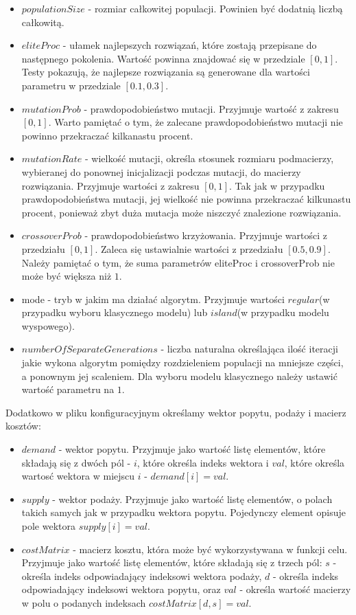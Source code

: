 \begin{itemize}
    \item $populationSize$ - rozmiar całkowitej populacji. Powinien być dodatnią liczbą całkowitą.
    \item $eliteProc$ - ułamek najlepszych rozwiązań, które zostają przepisane do następnego pokolenia. 
    Wartość powinna znajdować się w przedziale $[0, 1]$. Testy pokazują, że najlepsze rozwiązania są generowane dla wartości parametru w przedziale
    $[0.1, 0.3]$.
    \item $mutationProb$ - prawdopodobieństwo mutacji. Przyjmuje wartość z zakresu $[0, 1]$. Warto pamiętać o tym, że zalecane prawdopodobieństwo 
    mutacji nie powinno przekraczać kilkanastu procent.
    \item $mutationRate$ - wielkość mutacji, określa stosunek rozmiaru podmacierzy, wybieranej do ponownej inicjalizacji podczas mutacji, 
    do macierzy rozwiązania. Przyjmuje wartości z zakresu $[0, 1]$. Tak jak w przypadku prawdopodobieństwa mutacji, jej wielkość nie powinna 
    przekraczać kilkunastu procent, ponieważ zbyt duża mutacja może niszczyć znalezione rozwiązania.
    \item $crossoverProb$ - prawdopodobieństwo krzyżowania. Przyjmuje wartości z przedziału $[0, 1]$. Zaleca się ustawialnie wartości z przedziału 
    $[0.5, 0.9]$. Należy pamiętać o tym, że suma parametrów eliteProc i crossoverProb nie może być większa niż $1$.
    \item mode - tryb w jakim ma działać algorytm. Przyjmuje wartości $regular$(w przypadku wyboru klasycznego modelu) lub $island$(w przypadku 
    modelu wyspowego).
    \item $numberOfSeparateGenerations$ - liczba naturalna określająca ilość iteracji jakie wykona algorytm pomiędzy rozdzieleniem populacji na 
    mniejsze części, a ponownym jej scaleniem. Dla wyboru modelu klasycznego należy ustawić wartość parametru na $1$.
\end{itemize}

Dodatkowo w pliku konfiguracyjnym określamy wektor popytu, podaży i macierz kosztów:

\begin{itemize}
    \item $demand$ - wektor popytu. Przyjmuje jako wartość listę elementów, które składają się z dwóch pól - $i$, które określa indeks wektora i 
    $val$, które określa wartosć wektora w miejscu $i$ - $demand[i] = val$.
    \item $supply$ - wektor podaży. Przyjmuje jako wartość listę elementów, o polach takich samych jak w przypadku wektora popytu. Pojedynczy element 
    opisuje pole wektora $supply[i] = val$.
    \item $costMatrix$ - macierz kosztu, która może być wykorzystywana w funkcji celu. Przyjmuje jako wartość listę elementów, które składają się 
    z trzech pól: $s$ - określa indeks odpowiadający indeksowi wektora podaży, $d$ - określa indeks odpowiadający indeksowi wektora popytu, oraz 
    $val$ - określa wartość macierzy w polu o podanych indeksach $costMatrix[d, s] = val$.
\end{itemize}

